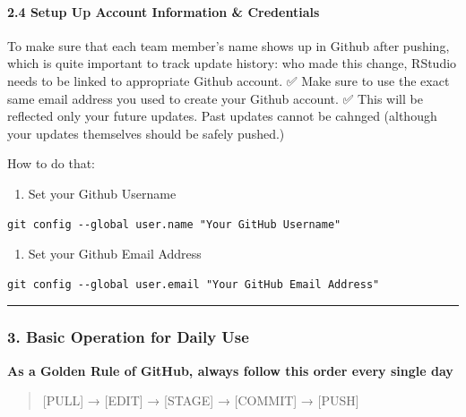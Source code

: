 \documentclass[
]{article}
\providecommand{\tightlist}{%
  \setlength{\itemsep}{0pt}\setlength{\parskip}{0pt}}
\begin{document}
\paragraph{\texorpdfstring{2.4 Setup Up Account Information \&
Credentials}{2.4 Setup Up Account Information \& Credentials }}\label{setup-up-account-information-credentials}

To make sure that each team member's name shows up in Github after
pushing, which is quite important to track update history: who made this
change, RStudio needs to be linked to appropriate Github account. ✅
Make sure to use the exact same email address you used to create your
Github account. ✅ This will be reflected only your future updates. Past
updates cannot be cahnged (although your updates themselves should be
safely pushed.)

How to do that:

\begin{enumerate}
\def\labelenumi{\arabic{enumi}.}
\tightlist
\item
  Set your Github Username
\end{enumerate}

\begin{verbatim}
git config --global user.name "Your GitHub Username"
\end{verbatim}

\begin{enumerate}
\def\labelenumi{\arabic{enumi}.}
\setcounter{enumi}{1}
\tightlist
\item
  Set your Github Email Address
\end{enumerate}

\begin{verbatim}
git config --global user.email "Your GitHub Email Address"
\end{verbatim}

\begin{center}\rule{0.5\linewidth}{0.5pt}\end{center}

\subsubsection{3. Basic Operation for Daily
Use}\label{basic-operation-for-daily-use}

\textbf{As a Golden Rule of GitHub, always follow this order every
single day}

\begin{quote}
{[}PULL{]} → {[}EDIT{]} → {[}STAGE{]} → {[}COMMIT{]} → {[}PUSH{]}
\end{quote}
\end{document}
